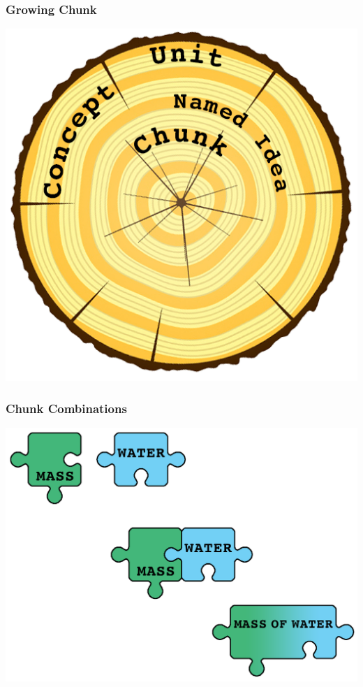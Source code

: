 \documentclass{beamer}
\begin{document}
\begin{frame}
\frametitle{Growing Chunk}
\centering
\includegraphics[scale=0.45]{Tree_Chunk_Model.png}
\end{frame}

\begin{frame}
\frametitle{Chunk Combinations}
\includegraphics[scale=0.19]{Puzzle.png}
\end{frame}
\end{document}
